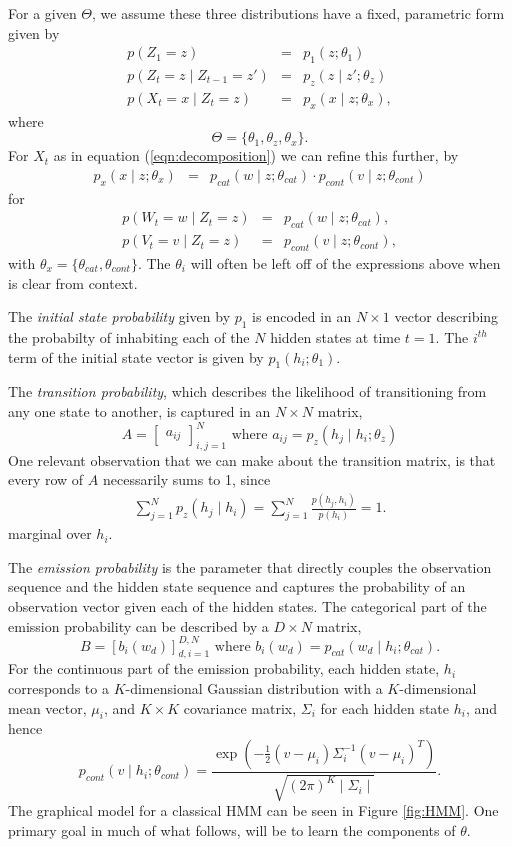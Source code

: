 \documentclass{amsart}
\begin{document}
For a given $\Theta$, we assume 
these three distributions have a fixed, parametric form given by 
\begin{eqnarray*}
p(Z_1=z) &=& p_1(z;\theta_1)\\
p(Z_t = z\mid Z_{t-1}=z') & = & p_z(z\mid z';\theta_z)\\
p(X_t=x\mid Z_t=z) & = &p_x(x\mid z;\theta_x),
\end{eqnarray*} 
where 
\[
\Theta = \{\theta_1,\theta_z,\theta_x\}.
\]
For $X_t$ as in equation (\ref{eqn:decomposition}) we can refine this further, 
by
\begin{eqnarray*}
p_x(x\mid z;\theta_x)& = &p_{cat}(w\mid z; \theta_{cat})\cdot p_{cont}(v\mid z; \theta_{cont})
\end{eqnarray*}
for
\begin{eqnarray*}
p(W_t=w\mid Z_t=z) & = & p_{cat}(w\mid z; \theta_{cat}),\\
p(V_t=v\mid Z_t=z) & = & p_{cont}(v\mid z; \theta_{cont}),
\end{eqnarray*}
with $\theta_x = \{\theta_{cat},\theta_{cont}\}$.
The $\theta_i$ will often be left off of the expressions above when is clear 
from context. 

The {\em initial state probability} given by $p_1$ is encoded in an $N\times 1$ 
vector describing the probabilty of inhabiting each of the $N$ hidden states at 
time $t=1$.  The $i^{th}$ term of the initial state vector is given by  
$p_1(h_i; \theta_1)$. 

The {\em transition probability}, which describes the 
likelihood of transitioning from any one state to another, is captured in an 
$N\times N$ matrix, 
\[
A=\begin{bmatrix}
a_{ij}
\end{bmatrix}_{i,j=1}^N \text{ where }a_{ij} = p_z(h_j\mid h_i;\theta_z)
\]
One relevant observation that we can make about the transition matrix, is that 
every row of $A$ necessarily sums to 1, since 
\begin{eqnarray}\label{eqn:transitionsum}
\sum_{j=1}^Np_z(h_j\mid h_i)=\sum_{j=1}^N\frac{p(h_j,h_i)}{p(h_i)}=1.
\end{eqnarray}
marginal over $h_i$.

The {\em emission probability} is the parameter that directly 
couples the observation sequence and the hidden 
state sequence and captures the probability of an observation vector given each 
of the hidden states. The categorical part of the emission probability can be 
described by a $D\times N$ matrix, 
\[
B = \left[b_{i}(w_d)\right]_{d,i=1}^{D,N}\text{ where }b_{i}(w_d) =p_{cat}(w_d\mid h_i; \theta_{cat}).
\]
For the continuous part of the emission probability, each hidden state, $h_i$ 
corresponds to a $K$-dimensional Gaussian distribution with a 
$K$-dimensional mean vector, $\mu_i$, 
and $K\times K$ covariance matrix, $\Sigma_i$ for each hidden state $h_i$, and 
hence 
\[
p_{cont}(v\mid 
h_i;\theta_{cont})=\frac{\exp\left(-\frac{1}{2}\left(v-\mu_i\right)\Sigma_i^{-1}\left(v-\mu_i\right)^T\right)}{\sqrt{(2\pi)^K\mid \Sigma_i\mid}}.
\]
The graphical model for a classical HMM can 
be seen in Figure \ref{fig:HMM}.  One primary goal in much of what follows, will be to learn the components of 
$\theta$.
\end{document}
